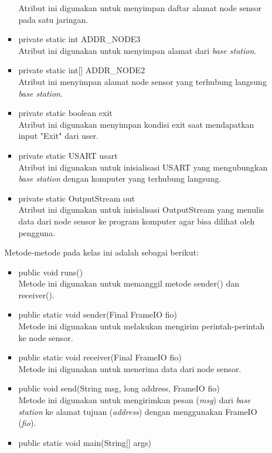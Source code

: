 \begin{itemize}
\begin{itemize}
\begin{itemize}
            Atribut ini digunakan untuk menyimpan daftar alamat node sensor pada satu jaringan.
            \item private static int ADDR\_NODE3\\
            Atribut ini digunakan untuk menyimpan alamat dari \textit{base station}.
            \item private static int[] ADDR\_NODE2\\
            Atribut ini menyimpan alamat node sensor yang terhubung langsung \textit{base station}.
            \item private static boolean exit\\
            Atribut ini digunakan menyimpan kondisi exit saat mendapatkan input "Exit" dari user.
            \item private static USART usart\\
            Atribut ini digunakan untuk inisialisasi USART yang mengubungkan \textit{base station} dengan komputer yang terhubung langsung.
            \item private static OutputStream out\\
            Atribut ini digunakan untuk inisialisasi OutputStream yang menulis data dari node sensor ke program komputer agar bisa dilihat oleh pengguna.
        \end{itemize}
        Metode-metode pada kelas ini adalah sebagai berikut:
        \begin{itemize}
            \item public void runs()\\
            Metode ini digunakan untuk memanggil metode sender() dan receiver().
            \item public static void sender(Final FrameIO fio)\\
            Metode ini digunakan untuk melakukan mengirim perintah-perintah ke node sensor.
            \item public static void receiver(Final FrameIO fio)\\
            Metode ini digunakan untuk menerima data dari node sensor. 
            \item public void send(String msg, long address, FrameIO fio)\\
            Metode ini digunakan untuk mengirimkan pesan (\textit{msg}) dari \textit{base station} ke alamat tujuan (\textit{address}) dengan menggunakan FrameIO (\textit{fio}).
            \item public static void main(String[] args)\\

\end{itemize}
\end{itemize}
\end{itemize}
